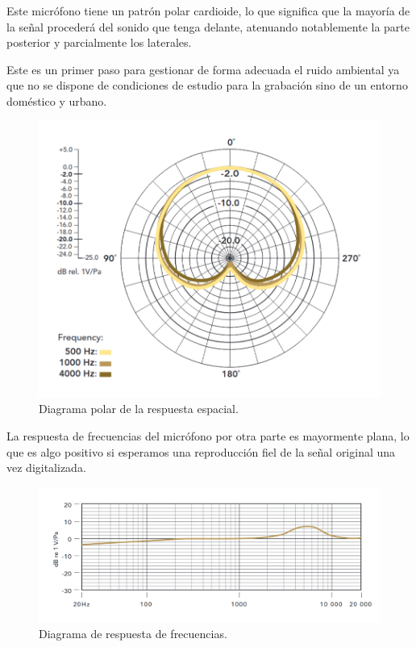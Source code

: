 Este micrófono tiene un patrón polar cardioide, lo que significa que la mayoría de la señal procederá del sonido que tenga delante, atenuando notablemente la parte posterior y parcialmente los laterales.

Este es un primer paso para gestionar de forma adecuada el ruido ambiental ya que no se dispone de condiciones de estudio para la grabación sino de un entorno doméstico y urbano.

\begin{figure}[H]
\centering
\includegraphics[width=14cm]{Z_anexos_img/rode-nt-polar.png}
\caption{Diagrama polar de la respuesta espacial.}
\label{fig:figure1}
\end{figure}


La respuesta de frecuencias del micrófono por otra parte es mayormente plana, lo que es algo positivo si esperamos una reproducción fiel de la señal original una vez digitalizada.

\begin{figure}[H]
\centering
\includegraphics[width=14cm]{Z_anexos_img/rode-nt-response.png}
\caption{Diagrama de respuesta de frecuencias.}
\label{fig:figure1}
\end{figure}

